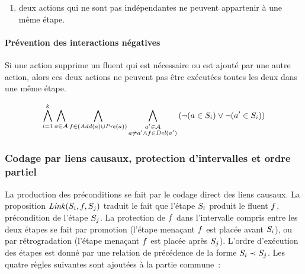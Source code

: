 {\begin{enumerate}
\item {} deux actions qui ne sont pas indépendantes ne peuvent appartenir à une même étape.
\end{enumerate}

\paragraph*{Prévention des interactions négatives}

Si une action supprime un fluent qui est nécessaire ou est ajouté par une autre action, alors ces deux actions ne peuvent pas être exécutées toutes les deux dans une même étape.

\begin{small}
\[
\bigwedge\limits_{\substack{i=1}}^{k}\bigwedge\limits_{\substack{\substack{a\in \mathcal{A}}}}\bigwedge\limits_{\substack{\substack{f\in \left(\mathit{Add}(a)\cup\mathit{Pre}(a)\right)}}}\bigwedge\limits_{\substack{\substack{a'\in \mathcal{A}\\a \neq a' \wedge f \in \mathit{Del}(a')}}}\left(\neg (a \in S_{i}) \vee \neg (a' \in S_{i})\right)
\]
\end{small}

\subsubsection{Codage par liens causaux, protection d'intervalles et ordre partiel}

La production des préconditions se fait par le codage direct des liens causaux.
La proposition $\mathit{Link}(S_{i},f,S_{j})$ traduit le fait que l'étape $S_{i}$ produit le fluent
$f$, précondition de l'étape $S_{j}$. La protection de $f$ dans l'intervalle compris
entre les deux étapes se fait par promotion (l'étape menaçant $f$ est placée
avant $S_{i}$), ou par rétrogradation (l'étape menaçant $f$ est placée après $S_{j}$).
L'ordre d'exécution des étapes  est donné par une relation de précédence de
la forme $S_{i} \prec S_{j}$. Les quatre règles suivantes sont ajoutées à la partie commune~:

}
